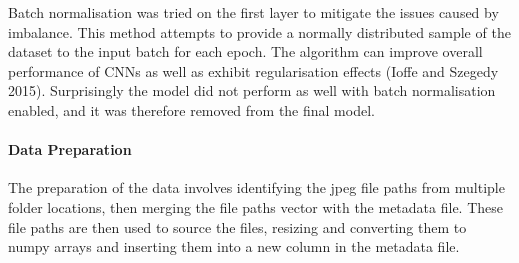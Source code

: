 \documentclass[11pt]{article}
\begin{document}
Batch normalisation was tried on the first layer to mitigate the issues
caused by imbalance. This method attempts to provide a normally
distributed sample of the dataset to the input batch for each epoch. The
algorithm can improve overall performance of CNNs as well as exhibit
regularisation effects (Ioffe and Szegedy 2015). Surprisingly the model
did not perform as well with batch normalisation enabled, and it was
therefore removed from the final model.

    \hypertarget{data-preparation}{%
\paragraph{Data Preparation}\label{data-preparation}}

The preparation of the data involves identifying the jpeg file paths
from multiple folder locations, then merging the file paths vector with
the metadata file. These file paths are then used to source the files,
resizing and converting them to numpy arrays and inserting them into a
new column in the metadata file.
\end{document}
